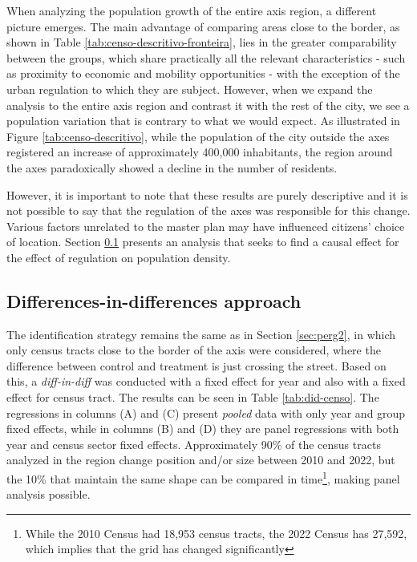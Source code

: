 

When analyzing the population growth of the entire axis region, a different picture emerges. The main advantage of comparing areas close to the border, as shown in Table \ref{tab:censo-descritivo-fronteira}, lies in the greater comparability between the groups, which share practically all the relevant characteristics - such as proximity to economic and mobility opportunities - with the exception of the urban regulation to which they are subject. However, when we expand the analysis to the entire axis region and contrast it with the rest of the city, we see a population variation that is contrary to what we would expect. As illustrated in Figure \ref{tab:censo-descritivo}, while the population of the city outside the axes registered an increase of approximately 400,000 inhabitants, the region around the axes paradoxically showed a decline in the number of residents.



However, it is important to note that these results are purely descriptive and it is not possible to say that the regulation of the axes was responsible for this change. Various factors unrelated to the master plan may have influenced citizens' choice of location. Section \ref{subsec:perg3did} presents an analysis that seeks to find a causal effect for the effect of regulation on population density.

\subsection{Differences-in-differences approach}
\label{subsec:perg3did}

The identification strategy remains the same as in Section \ref{sec:perg2}, in which only census tracts close to the border of the axis were considered, where the difference between control and treatment is just crossing the street. Based on this, a \textit{diff-in-diff} was conducted with a fixed effect for year and also with a fixed effect for census tract. The results can be seen in Table \ref{tab:did-censo}. The regressions in columns (A) and (C) present \textit{pooled} data with only year and group fixed effects, while in columns (B) and (D) they are panel regressions with both year and census sector fixed effects. Approximately 90\% of the census tracts analyzed in the region change position and/or size between 2010 and 2022, but the 10\% that maintain the same shape can be compared in time\footnote{While the 2010 Census had 18,953 census tracts, the 2022 Census has 27,592, which implies that the grid has changed significantly}, making panel analysis possible.

